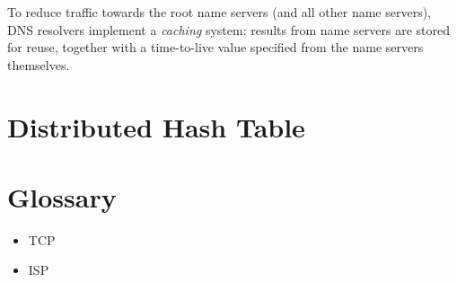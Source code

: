 \documentclass[mscthesis]{usiinfthesis}
\begin{document}
To reduce traffic towards the root name servers (and all other name servers), DNS resolvers implement a \emph{caching} system: results from name servers are stored for reuse, together with a time-to-live value specified from the name servers themselves. 

\chapter{Distributed Hash Table}\label{appx:dht}

\backmatter

\chapter{Glossary}
\begin{itemize}
	\item TCP
	\item ISP
	
\end{itemize}

%
%


\end{document}
